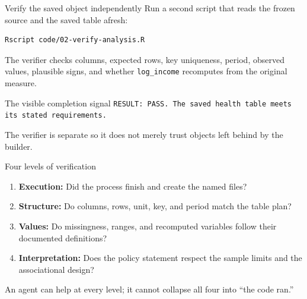 \begin{frame}[fragile]{Verify the saved object independently}
  Run a second script that reads the frozen source and the saved table afresh:

\begin{lstlisting}
Rscript code/02-verify-analysis.R
\end{lstlisting}

  The verifier checks columns, expected rows, key uniqueness, period, observed
  values, plausible signs, and whether \texttt{log\_income} recomputes from the
  original measure.

  \begin{block}{The visible completion signal}
    \texttt{RESULT: PASS. The saved health table meets its stated requirements.}
  \end{block}

  The verifier is separate so it does not merely trust objects left behind by
  the builder.
\end{frame}

\begin{frame}{Four levels of verification}
  \begin{enumerate}
    \item \textbf{Execution:} Did the process finish and create the named files?
    \item \textbf{Structure:} Do columns, rows, unit, key, and period match the table plan?
    \item \textbf{Values:} Do missingness, ranges, and recomputed variables follow
      their documented definitions?
    \item \textbf{Interpretation:} Does the policy statement respect the sample
      limits and the associational design?
  \end{enumerate}

  \vfill
  An agent can help at every level; it cannot collapse all four into ``the code
  ran.''
\end{frame}
